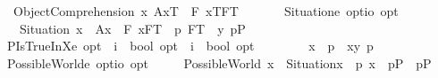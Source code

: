 \begin{isabellebody}
\ \ ObjectComprehension{\isacharcolon}\ {\isachardoublequoteopen}{\isacharbrackleft}{\isacharparenleft}\isactrlbold {\isasymexists}x{\isachardot}\ {\isasymlparr}A{\isacharbang}{\isacharcomma}x\isactrlsup T{\isasymrparr}\ \isactrlbold {\isasymand}\ {\isacharparenleft}\isactrlbold {\isasymforall}F{\isachardot}\ {\isasymlbrace}x\isactrlsup T{\isacharcomma}F\isactrlsup T{\isasymrbrace}\ \isactrlbold {\isasymequiv}\ {\isasymphi}{\isacharparenright}{\isacharparenright}{\isacharbrackright}\ {\isacharequal}\ {\isasymtop}{\isachardoublequoteclose}\isanewline
\isanewline
\ \isamarkupfalse%
\ Situation{\isacharcolon}{\isacharcolon}{\isachardoublequoteopen}e\ opt{\isasymRightarrow}io\ opt{\isachardoublequoteclose}\ \ \ \isanewline
\ \ \ {\isachardoublequoteopen}Situation\ x\ {\isasymequiv}\ {\isacharparenleft}{\isasymlparr}A{\isacharbang}{\isacharcomma}x{\isasymrparr}\ \isactrlbold {\isasymand}\ {\isacharparenleft}\isactrlbold {\isasymforall}F{\isachardot}\ {\isacharparenleft}{\isasymlbrace}x{\isacharcomma}F\isactrlsup T{\isasymrbrace}\ \isactrlbold {\isasymrightarrow}\ {\isacharparenleft}\isactrlbold {\isasymexists}p{\isachardot}\ F\isactrlsup T\ \isactrlbold {\isacharequal}\ {\isacharparenleft}\isactrlbold {\isasymlambda}y{\isachardot}\ p\isactrlsup P{\isacharparenright}{\isacharparenright}{\isacharparenright}{\isacharparenright}{\isacharparenright}{\isachardoublequoteclose}\isanewline
\ \isamarkupfalse%
\ PIsTrueInX{\isacharcolon}{\isacharcolon}{\isachardoublequoteopen}e\ opt\ {\isasymRightarrow}\ {\isacharparenleft}i\ {\isasymRightarrow}\ bool{\isacharparenright}\ opt\ {\isasymRightarrow}\ {\isacharparenleft}i\ {\isasymRightarrow}\ bool{\isacharparenright}\ opt{\isachardoublequoteclose}\ {\isacharparenleft}\ {\isachardoublequoteopen}{\isasymTurnstile}{\isachardoublequoteclose}\ {}{}{\isacharparenright}\ \ \isanewline
\ \ \ {\isachardoublequoteopen}x\ {\isasymTurnstile}\ p\ {\isasymequiv}\ {\isasymlbrace}x{\isacharcomma}{\isacharparenleft}\isactrlbold {\isasymlambda}y{\isachardot}\ p{\isacharparenright}{\isasymrbrace}{\isachardoublequoteclose}\ \ \isanewline
\ \isamarkupfalse%
\ PossibleWorld{\isacharcolon}{\isacharcolon}{\isachardoublequoteopen}e\ opt{\isasymRightarrow}io\ opt{\isachardoublequoteclose}\ \ \isanewline
\ \ \ {\isachardoublequoteopen}PossibleWorld\ x\ {\isasymequiv}\ Situation{\isacharparenleft}x{\isacharparenright}\ \isactrlbold {\isasymand}\ \isactrlbold {\isasymdiamond}{\isacharparenleft}\isactrlbold {\isasymforall}p{\isachardot}\ {\isacharparenleft}x\ {\isasymTurnstile}\ p\isactrlsup P{\isacharparenright}\ \isactrlbold {\isasymequiv}\ p\isactrlsup P{\isacharparenright}{\isachardoublequoteclose}\ \isanewline

\end{isabellebody}
